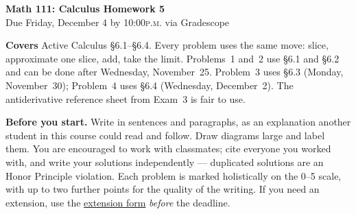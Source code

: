 \documentclass[11pt]{article}
\begin{document}
\begin{center}
{\Large\bfseries Math 111: Calculus \quad Homework 5}\\[4pt]
{Due Friday, December 4 by 10:00\textsc{p.m.} via Gradescope}
\end{center}

\medskip
\noindent\textbf{Covers} Active Calculus \S6.1--\S6.4. Every problem uses the same move:
slice, approximate one slice, add, take the limit. Problems~1 and~2 use \S6.1 and \S6.2 and
can be done after Wednesday, November~25. Problem~3 uses \S6.3 (Monday, November~30);
Problem~4 uses \S6.4 (Wednesday, December~2). The antiderivative reference sheet from
Exam~3 is fair to use.

\smallskip
\noindent\textbf{Before you start.} Write in sentences and paragraphs, as an
explanation another student in this course could read and follow. Draw diagrams large
and label them. You are encouraged to work with classmates; cite everyone you worked
with, and write your solutions independently --- duplicated solutions are an Honor
Principle violation. Each problem is marked holistically on the 0--5 scale, with up
to two further points for the quality of the writing. If you need an extension, use
the \href{https://docs.google.com/forms/d/e/1FAIpQLSfIfgx44SFtUzefTNr-80yz35MVJaUqQttt96xVTU5mCQCOgg/viewform}{extension
form} \emph{before} the deadline.
\end{document}
